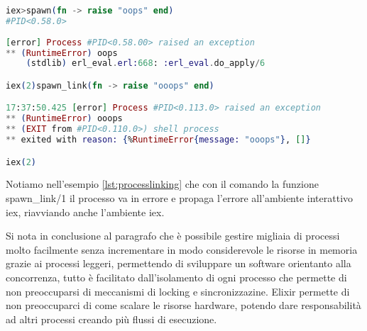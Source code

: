 \begin{lstlisting}[language=elixir, caption={Process linking},captionpos=b,
	label={lst:processlinking}]
iex>spawn(fn -> raise "oops" end)
#PID<0.58.0>
	
[error] Process #PID<0.58.00> raised an exception
** (RuntimeError) oops
	(stdlib) erl_eval.erl:668: :erl_eval.do_apply/6

iex(2)spawn_link(fn -> raise "ooops" end)

17:37:50.425 [error] Process #PID<0.113.0> raised an exception
** (RuntimeError) ooops
** (EXIT from #PID<0.110.0>) shell process 
** exited with reason: {%RuntimeError{message: "ooops"}, []}

iex(2)
\end{lstlisting}

Notiamo nell'esempio \ref{lst:processlinking} che con il comando
la funzione spawn\_link/1 il processo va in errore e propaga
l'errore all'ambiente interattivo iex, riavviando anche
l'ambiente iex.

Si nota in conclusione al paragrafo che è possibile
gestire migliaia di processi molto facilmente senza
incrementare in modo considerevole le risorse in memoria grazie
ai processi leggeri, permettendo
di sviluppare un software orientanto alla concorrenza,
tutto è facilitato dall'isolamento di ogni processo che 
permette di non preoccuparsi di meccanismi di locking e sincronizzazine.
Elixir permette di non preoccuparci di come scalare
le risorse hardware, potendo dare responsabilità ad altri
processi creando più flussi di esecuzione.